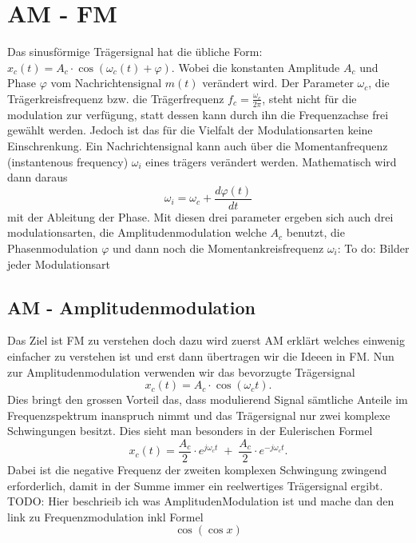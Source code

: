 %
%
%
\section{AM - FM\label{fm:section:teil0}}

Das sinusförmige Trägersignal hat die übliche Form: 
\(x_c(t) = A_c \cdot \cos(\omega_c(t)+\varphi)\).
Wobei die konstanten Amplitude \(A_c\) und Phase \(\varphi\) vom Nachrichtensignal \(m(t)\) verändert wird.
Der Parameter \(\omega_c\), die Trägerkreisfrequenz bzw. die Trägerfrequenz \(f_c = \frac{\omega_c}{2\pi}\),
steht nicht für die modulation zur verfügung, statt dessen kann durch ihn die Frequenzachse frei gewählt werden.
\newblockpunct
Jedoch ist das für die Vielfalt der Modulationsarten keine Einschrenkung.
Ein Nachrichtensignal kann auch über die Momentanfrequenz (instantenous frequency) \(\omega_i\) eines trägers verändert werden.
Mathematisch wird dann daraus
\[
    \omega_i = \omega_c + \frac{d \varphi(t)}{dt}
\]
mit der Ableitung der Phase\cite{fm:NAT}.
Mit diesen drei parameter ergeben sich auch drei modulationsarten, die Amplitudenmodulation welche \(A_c\) benutzt, 
die Phasenmodulation \(\varphi\) und dann noch die Momentankreisfrequenz \(\omega_i\):
\newline
\newline
To do: Bilder jeder Modulationsart

\subsection{AM - Amplitudenmodulation}
Das Ziel ist FM zu verstehen doch dazu wird zuerst AM erklärt welches einwenig einfacher zu verstehen ist und erst dann übertragen wir die Ideeen in FM.
Nun zur Amplitudenmodulation verwenden wir das bevorzugte Trägersignal
\[
    x_c(t) = A_c \cdot \cos(\omega_ct).
\]
Dies bringt den grossen Vorteil das, dass modulierend Signal sämtliche Anteile im Frequenzspektrum inanspruch nimmt 
und das Trägersignal nur  zwei komplexe Schwingungen besitzt. 
Dies sieht man besonders in der Eulerischen Formel
\[
    x_c(t) = \frac{A_c}{2} \cdot e^{j\omega_ct}\;+\;\frac{A_c}{2} \cdot e^{-j\omega_ct}.
\]
Dabei ist die negative Frequenz der zweiten komplexen Schwingung zwingend erforderlich, damit in der Summe immer ein reelwertiges Trägersignal ergibt.
\newline
TODO:
Hier beschrieib ich was AmplitudenModulation ist und mache dan den link zu Frequenzmodulation inkl Formel \[\cos( \cos x)\]
